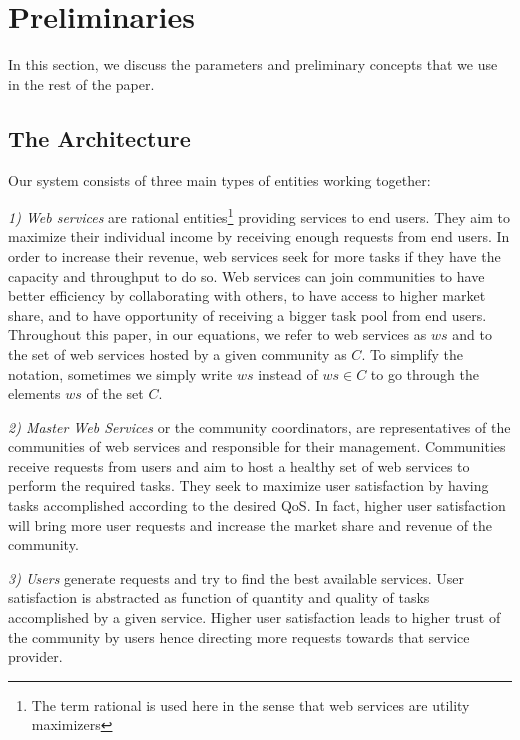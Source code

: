 \documentclass[10pt,journal,cspaper,compsoc]{IEEEtran}
\begin{document}



\section{Preliminaries}\label{s:preliminaries}

In this section, we discuss the parameters and preliminary
concepts that we use in the rest of the paper.

\subsection{The Architecture}

Our system consists of three main types of entities working
together:

\emph{1) Web services} are rational entities\footnote{The term
rational is used here in the sense that web services are utility
maximizers} providing services to end users. They aim to maximize
their individual income by receiving enough requests from end
users. In order to increase their revenue, web services seek for
more tasks if they have the capacity and throughput to do so. Web
services can join communities to have better efficiency by
collaborating with others, to have access to higher market share,
and to have opportunity of receiving a bigger task pool from end
users. Throughout this paper, in
our equations, we refer to web services as $ws$ and to the set of
web services hosted by a given community as $C$. To simplify the
notation, sometimes we simply write $ws$ instead of $ws \in C$ to
go through the elements $ws$ of the set $C$.

\emph{2) Master Web Services} or the community coordinators, are representatives of the
communities of web services and responsible for their management.
Communities receive requests from users and aim to host a healthy
set of web services to perform the required tasks. They seek to
maximize user satisfaction by having tasks accomplished according
to the desired QoS. In fact, higher user satisfaction will bring
more user requests and increase the market share and revenue of
the community.

\emph{3) Users} generate requests and try to find the best
available services. User satisfaction is abstracted as function of
quantity and quality of tasks accomplished by a given service. 
Higher user satisfaction leads to higher trust of the community by users hence directing more requests towards that service provider.
\end{document}
